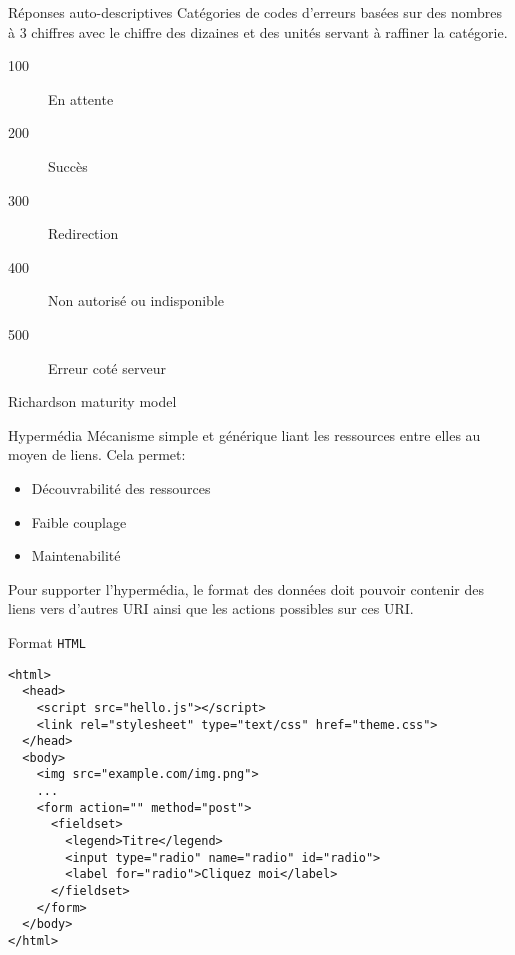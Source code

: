 \documentclass{beamer}
\begin{document}
\begin{frame}{Réponses auto-descriptives}
  Catégories de codes d'erreurs basées sur des nombres à 3 chiffres
  avec le chiffre des dizaines et des unités servant à raffiner la
  catégorie.

  \begin{description}
  \item [100] En attente
  \item [200] Succès
  \item [300] Redirection
  \item [400] Non autorisé ou indisponible
  \item [500] Erreur coté serveur
  \end{description}
\end{frame}

\begin{frame}{Richardson maturity model}
  \begin{center}
  \end{center}
\end{frame}

\begin{frame}{Hypermédia}
  Mécanisme simple et générique liant les ressources entre
  elles au moyen de liens. Cela permet:
  \begin{itemize}
  \item Découvrabilité des ressources
  \item Faible couplage
  \item Maintenabilité
  \end{itemize}

  Pour supporter l'hypermédia, le format des données doit pouvoir
  contenir des liens vers d'autres URI ainsi que les actions possibles
  sur ces URI.
\end{frame}

\begin{frame}[fragile]{Format \verb#HTML#}
  \scriptsize
\begin{verbatim}
<html>
  <head>
    <script src="hello.js"></script>
    <link rel="stylesheet" type="text/css" href="theme.css">
  </head>
  <body>
    <img src="example.com/img.png">
    ...
    <form action="" method="post">
      <fieldset>
        <legend>Titre</legend>
        <input type="radio" name="radio" id="radio">
        <label for="radio">Cliquez moi</label>
      </fieldset>
    </form>
  </body>
</html>
\end{verbatim}
\end{frame}
\end{document}
